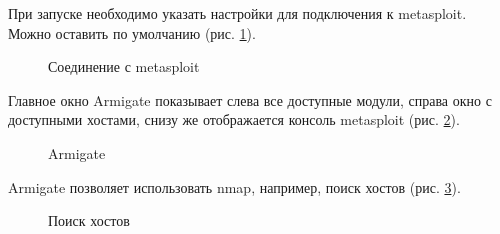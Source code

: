 \documentclass[10pt,a4paper,titlepage]{article}
\begin{document}
При запуске необходимо указать настройки для подключения к metasploit. Можно оставить по умолчанию (рис. \ref{ris:image1}).
\begin{figure}[h]	
\caption{Соединение с metasploit}
\label{ris:image1}
\end{figure}

Главное окно Armigate показывает слева все доступные модули, справа окно с доступными хостами, снизу же отображается консоль metasploit (рис. \ref{ris:image2}).
\begin{figure}[h]	
\caption{Armigate}
\label{ris:image2}
\end{figure}
\newpage
Armigate позволяет использовать nmap, например, поиск хостов (рис. \ref{ris:image3}).
\begin{figure}[h]	
\caption{Поиск хостов}
\label{ris:image3}
\end{figure}
\end{document}
